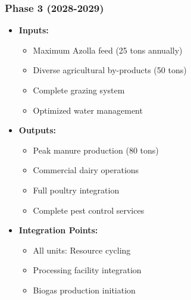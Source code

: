 \subsubsection{Phase 3 (2028-2029)}
\begin{itemize}
    \item \textbf{Inputs:}
    \begin{itemize}
        \item Maximum Azolla feed (25 tons annually)
        \item Diverse agricultural by-products (50 tons)
        \item Complete grazing system
        \item Optimized water management
    \end{itemize}
    \item \textbf{Outputs:}
    \begin{itemize}
        \item Peak manure production (80 tons)
        \item Commercial dairy operations
        \item Full poultry integration
        \item Complete pest control services
    \end{itemize}
    \item \textbf{Integration Points:}
    \begin{itemize}
        \item All units: Resource cycling
        \item Processing facility integration
        \item Biogas production initiation
    \end{itemize}
\end{itemize}

